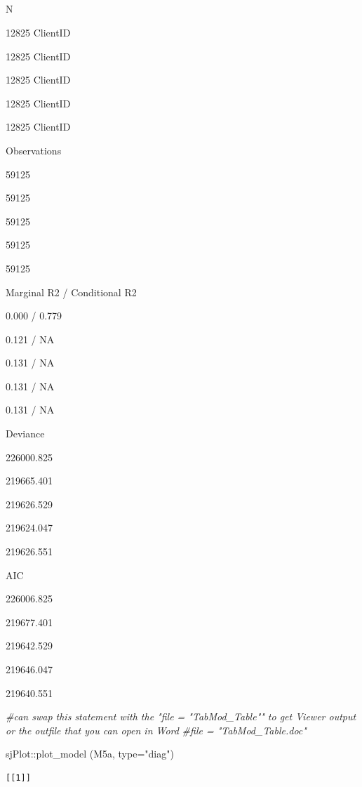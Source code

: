 \documentclass[
  11pt,
]{book}
\newenvironment{Shaded}{\begin{snugshade}}{\end{snugshade}}
\newcommand{\AttributeTok}[1]{\textcolor[rgb]{0.77,0.63,0.00}{#1}}
\newcommand{\CommentTok}[1]{\textcolor[rgb]{0.56,0.35,0.01}{\textit{#1}}}
\newcommand{\FunctionTok}[1]{\textcolor[rgb]{0.00,0.00,0.00}{#1}}
\newcommand{\NormalTok}[1]{#1}
\newcommand{\SpecialCharTok}[1]{\textcolor[rgb]{0.00,0.00,0.00}{#1}}
\newcommand{\StringTok}[1]{\textcolor[rgb]{0.31,0.60,0.02}{#1}}
\begin{document}
~

~

~

~

N

12825 ClientID

12825 ClientID

12825 ClientID

12825 ClientID

12825 ClientID

Observations

59125

59125

59125

59125

59125

Marginal R2 / Conditional R2

0.000 / 0.779

0.121 / NA

0.131 / NA

0.131 / NA

0.131 / NA

Deviance

226000.825

219665.401

219626.529

219624.047

219626.551

AIC

226006.825

219677.401

219642.529

219646.047

219640.551

\begin{Shaded}
\begin{Highlighting}[]
\CommentTok{\#can swap this statement with the "file = "TabMod\_Table"" to get Viewer output or the outfile that you can open in Word}
\CommentTok{\#file = "TabMod\_Table.doc"}
\end{Highlighting}
\end{Shaded}

\begin{Shaded}
\begin{Highlighting}[]
\NormalTok{sjPlot}\SpecialCharTok{::}\FunctionTok{plot\_model}\NormalTok{ (M5a, }\AttributeTok{type=}\StringTok{"diag"}\NormalTok{)}
\end{Highlighting}
\end{Shaded}

\begin{verbatim}
[[1]]
\end{verbatim}
\end{document}
